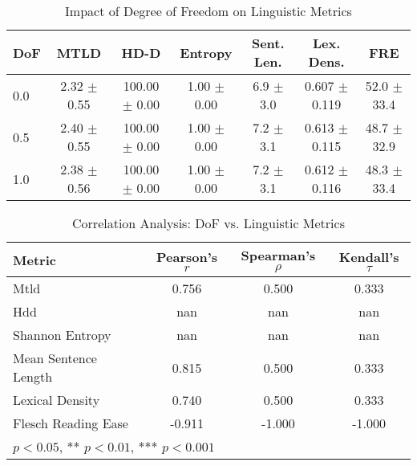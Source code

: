 \begin{table}[htbp]
\centering
\caption{Impact of Degree of Freedom on Linguistic Metrics}
\label{tab:dof_metrics}
\begin{tabular}{lcccccc}
\toprule
DoF & MTLD & HD-D & Entropy & Sent. Len. & Lex. Dens. & FRE \\
\midrule
0.0 & 2.32 $\pm$ 0.55 & 100.00 $\pm$ 0.00 & 1.00 $\pm$ 0.00 & 6.9 $\pm$ 3.0 & 0.607 $\pm$ 0.119 & 52.0 $\pm$ 33.4 \\
0.5 & 2.40 $\pm$ 0.55 & 100.00 $\pm$ 0.00 & 1.00 $\pm$ 0.00 & 7.2 $\pm$ 3.1 & 0.613 $\pm$ 0.115 & 48.7 $\pm$ 32.9 \\
1.0 & 2.38 $\pm$ 0.56 & 100.00 $\pm$ 0.00 & 1.00 $\pm$ 0.00 & 7.2 $\pm$ 3.1 & 0.612 $\pm$ 0.116 & 48.3 $\pm$ 33.4 \\
\bottomrule
\end{tabular}
\end{table}

\begin{table}[htbp]
\centering
\caption{Correlation Analysis: DoF vs. Linguistic Metrics}
\label{tab:correlations}
\begin{tabular}{lccc}
\toprule
Metric & Pearson's $r$ & Spearman's $\rho$ & Kendall's $\tau$ \\
\midrule
Mtld & 0.756 & 0.500 & 0.333 \\
Hdd & nan & nan & nan \\
Shannon Entropy & nan & nan & nan \\
Mean Sentence Length & 0.815 & 0.500 & 0.333 \\
Lexical Density & 0.740 & 0.500 & 0.333 \\
Flesch Reading Ease & -0.911 & -1.000 & -1.000 \\
\bottomrule
\multicolumn{4}{l}{\footnotesize * $p < 0.05$, ** $p < 0.01$, *** $p < 0.001$} \\
\end{tabular}
\end{table}